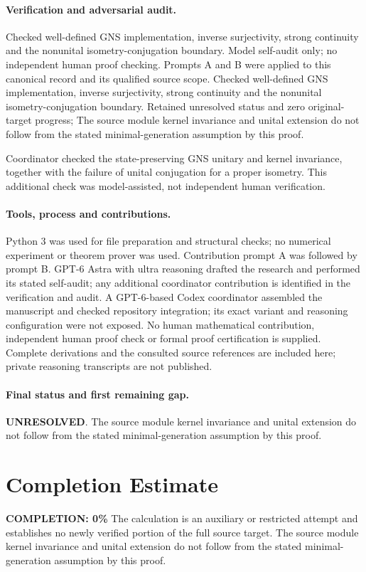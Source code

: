 \documentclass[11pt]{article}
\begin{document}
\paragraph{Verification and adversarial audit.}
Checked well-defined GNS implementation, inverse surjectivity, strong continuity and the nonunital isometry-conjugation boundary. Model self-audit only; no independent human proof checking. Prompts A and B were applied to this canonical record and its qualified source scope. Checked well-defined GNS implementation, inverse surjectivity, strong continuity and the nonunital isometry-conjugation boundary. Retained unresolved status and zero original-target progress; The source module kernel invariance and unital extension do not follow from the stated minimal-generation assumption by this proof.

Coordinator checked the state-preserving GNS unitary and kernel invariance, together with the failure of unital conjugation for a proper isometry. This additional check was model-assisted, not independent human verification.

\paragraph{Tools, process and contributions.}
Python 3 was used for file preparation and structural checks; no numerical experiment or theorem prover was used. Contribution prompt A was followed by prompt B. GPT-6 Astra with ultra reasoning drafted the research and performed its stated self-audit; any additional coordinator contribution is identified in the verification and audit. A GPT-6-based Codex coordinator assembled the manuscript and checked repository integration; its exact variant and reasoning configuration were not exposed. No human mathematical contribution, independent human proof check or formal proof certification is supplied. Complete derivations and the consulted source references are included here; private reasoning transcripts are not published.

\paragraph{Final status and first remaining gap.}
\textbf{UNRESOLVED}. The source module kernel invariance and unital extension do not follow from the stated minimal-generation assumption by this proof.

\section{Completion Estimate}
\noindent\textbf{COMPLETION: 0\%}
The calculation is an auxiliary or restricted attempt and establishes no newly verified portion of the full source target. The source module kernel invariance and unital extension do not follow from the stated minimal-generation assumption by this proof.
\end{document}
